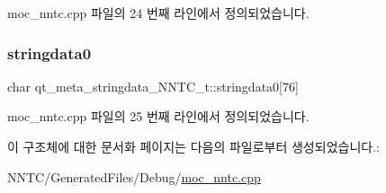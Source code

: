 moc\+\_\+nntc.\+cpp 파일의 24 번째 라인에서 정의되었습니다.

\mbox{\label{structqt__meta__stringdata___n_n_t_c__t_a548db5e4d601c75e146dbff640fcdbd8}} 
\subsubsection{\texorpdfstring{stringdata0}{stringdata0}}
{\footnotesize\ttfamily char qt\+\_\+meta\+\_\+stringdata\+\_\+\+N\+N\+T\+C\+\_\+t\+::stringdata0\mbox{[}76\mbox{]}}



moc\+\_\+nntc.\+cpp 파일의 25 번째 라인에서 정의되었습니다.



이 구조체에 대한 문서화 페이지는 다음의 파일로부터 생성되었습니다.\+:\begin{DoxyCompactItemize}
\item 
N\+N\+T\+C/\+Generated\+Files/\+Debug/\mbox{\hyperlink{moc__nntc_8cpp}{moc\+\_\+nntc.\+cpp}}\end{DoxyCompactItemize}
